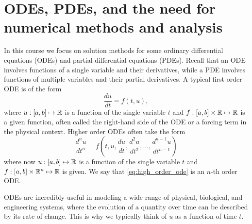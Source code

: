 \chapter{ODEs, PDEs, and the need for numerical methods
and analysis}
\label{ch:Lec1-intro}

In this course we focus on solution methods for some ordinary differential 
equations (ODEs) and partial differential equations (PDEs). Recall that 
an ODE involves functions of a single variable and their derivatives, while a PDE involves functions of multiple variables and their partial derivatives. A typical first 
order ODE is of the form 
\begin{equation}\label{eq:first_order_ode}
    \frac{du}{dt} = f(t,u),
\end{equation}
where $u:[a,b] \mapsto \mathbb{R}$ is a function of the single variable $t$ and $f:[a,b] \times \mathbb{R} \mapsto \mathbb{R}$ is a given function, often called the right-hand side of the ODE or a forcing term in the physical context. Higher order ODEs often take the form 
\begin{equation}\label{eq:high_order_ode}
    \frac{d^n u}{dt^n} = f(t,u,\frac{du}{dt},\frac{d^2 u}{dt^2},\dots,\frac{d^{n-1} u}{dt^{n-1}})
\end{equation}
where now $u:[a,b] \mapsto \mathbb{R}$ is a function of the single variable $t$ and $f:[a,b] \times \mathbb{R}^n \mapsto \mathbb{R}$ is  given. We say that \eqref{eq:high_order_ode} is an $n$-th order ODE.

ODEs are incredibly useful in modeling a wide range of physical, biological, and engineering systems, where the evolution of a quantity over time can be described by its rate of change. This is why we typically think of $u$ as a function of time $t$. 

